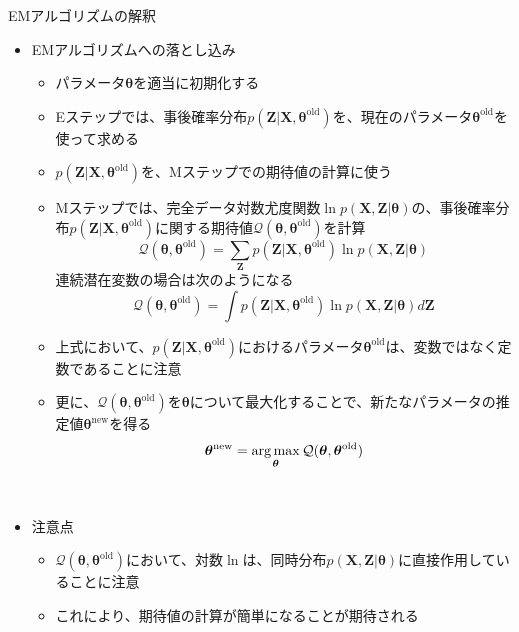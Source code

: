 \documentclass[dvipdfmx,notheorems,t]{beamer}
\begin{document}
\begin{frame}{EMアルゴリズムの解釈}

\begin{itemize}
	\item EMアルゴリズムへの落とし込み
	\begin{itemize}
		\item パラメータ$\bm{\theta}$を適当に初期化する
		\newline
		\item \alert{Eステップ}では、事後確率分布$p(\bm{Z} | \bm{X}, \bm{\theta}^\mathrm{old})$を、現在のパラメータ$\bm{\theta}^\mathrm{old}$を使って求める
		\item $p(\bm{Z} | \bm{X}, \bm{\theta}^\mathrm{old})$を、Mステップでの期待値の計算に使う
		\newline
		\item \alert{Mステップ}では、完全データ対数尤度関数$\ln p(\bm{X}, \bm{Z} | \bm{\theta})$の、事後確率分布$p(\bm{Z} | \bm{X}, \bm{\theta}^\mathrm{old})$に関する期待値$\mathcal{Q}(\bm{\theta}, \bm{\theta}^\mathrm{old})$を計算
		\begin{equation}
			\mathcal{Q}(\bm{\theta}, \bm{\theta}^\mathrm{old}) = \sum_{\bm{Z}} p(\bm{Z} | \bm{X}, \bm{\theta}^\mathrm{old}) \ln p(\bm{X}, \bm{Z} | \bm{\theta})
		\end{equation}
		連続潜在変数の場合は次のようになる
		\begin{equation}
			\mathcal{Q}(\bm{\theta}, \bm{\theta}^\mathrm{old}) = \int p(\bm{Z} | \bm{X}, \bm{\theta}^\mathrm{old}) \ln p(\bm{X}, \bm{Z} | \bm{\theta}) d\bm{Z}
		\end{equation}
		
		\item 上式において、$p(\bm{Z} | \bm{X}, \bm{\theta}^\mathrm{old})$におけるパラメータ$\bm{\theta}^\mathrm{old}$は、\alert{変数ではなく定数であることに注意}
		\newline
		
		\item 更に、$\mathcal{Q}(\bm{\theta}, \bm{\theta}^\mathrm{old})$を$\bm{\theta}$について最大化することで、新たなパラメータの推定値$\bm{\theta}^\mathrm{new}$を得る
		\begin{equation}
			\bm{\theta}^\mathrm{new} = \operatorname*{arg\,max}_{\bm{\theta}} \mathcal{Q}(\bm{\theta}, \bm{\theta}^\mathrm{old})
		\end{equation}
	\end{itemize} \
	
	\item 注意点
	\begin{itemize}
		\item $\mathcal{Q}(\bm{\theta}, \bm{\theta}^\mathrm{old})$において、対数$\ln$は、\color{red}同時分布$p(\bm{X}, \bm{Z} | \bm{\theta})$に直接作用している\normalcolor ことに注意
		\item これにより、期待値の計算が簡単になることが期待される
	\end{itemize} \
	

\end{itemize}
\end{frame}
\end{document}
